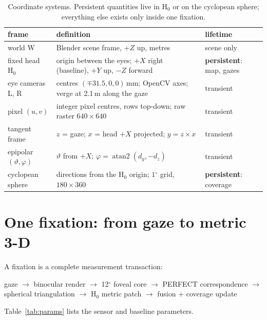 \documentclass[11pt,a4paper]{article}
\newcommand{\Hz}{\ensuremath{\mathrm{H}_0}}
\newcommand{\degr}{\ensuremath{^\circ}}
\begin{document}
\begin{table}[h]
\centering\small
\caption{Coordinate systems. Persistent quantities live in \Hz{} or on the cyclopean sphere; everything else exists
only inside one fixation.}
\label{tab:frames}
\begin{tabularx}{\linewidth}{@{}l X l@{}}
\toprule
frame & definition & lifetime \\
\midrule
world W & Blender scene frame, $+Z$ up, metres & scene only \\
fixed head \Hz{} & origin between the eyes; $+X$ right (baseline), $+Y$ up, $-Z$ forward &
  \textbf{persistent}: map, gazes \\
eye cameras L, R & centres $(\mp31.5, 0, 0)$\,mm; OpenCV axes; verge at 2.1\,m along the gaze & transient \\
pixel $(u,v)$ & integer pixel centres, rows top-down; raw raster $640\times640$ & transient \\
tangent frame & $z$ = gaze; $x$ = head $+X$ projected; $y = z\times x$ & transient \\
epipolar $(\vartheta,\varphi)$ & $\vartheta$ from $+X$; $\varphi = \operatorname{atan2}(d_y,-d_z)$ & transient \\
cyclopean sphere & directions from the \Hz{} origin; $1\degr$ grid, $180\times360$ & \textbf{persistent}: coverage \\
\bottomrule
\end{tabularx}
\end{table}

\section{One fixation: from gaze to metric 3-D}\label{sec:fixation}

A fixation is a complete measurement transaction:
\begin{center}
\sffamily gaze $\rightarrow$ binocular render $\rightarrow$ 12\degr{} foveal core $\rightarrow$ PERFECT correspondence
$\rightarrow$ spherical triangulation $\rightarrow$ \Hz{} metric patch $\rightarrow$ fusion + coverage update
\end{center}
Table~\ref{tab:params} lists the sensor and baseline parameters.
\end{document}
